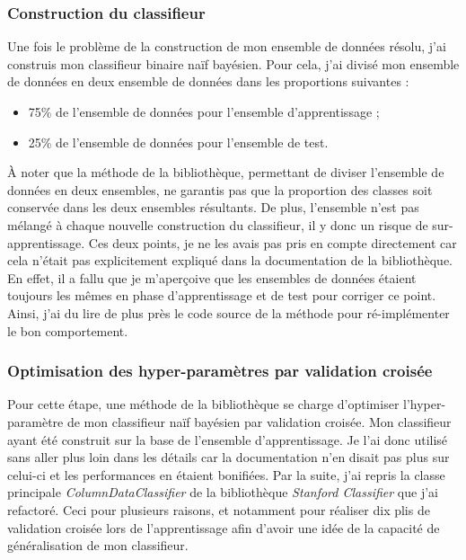             \subsubsection{Construction du classifieur}
                Une fois le problème de la construction de mon ensemble de données résolu, j'ai construis mon classifieur binaire naïf bayésien. Pour cela, j'ai divisé mon ensemble de données en deux ensemble de données dans les proportions suivantes :
                \begin{itemize}
                    \item 75\% de l'ensemble de données pour l'ensemble d'apprentissage ;
                    \item 25\% de l'ensemble de données pour l'ensemble de test.\\
                \end{itemize}
                À noter que la méthode de la bibliothèque, permettant de diviser l'ensemble de données en deux ensembles, ne garantis pas que la proportion des classes soit conservée dans les deux ensembles résultants. De plus, l'ensemble n'est pas mélangé à chaque nouvelle construction du classifieur, il y donc un risque de sur-apprentissage. Ces deux points, je ne les avais pas pris en compte directement car cela n'était pas explicitement expliqué dans la documentation de la bibliothèque. En effet, il a fallu que je m'aperçoive que les ensembles de données étaient toujours les mêmes en phase d'apprentissage et de test pour corriger ce point. Ainsi, j'ai du lire de plus près le code source de la méthode pour ré-implémenter le bon comportement.

            \subsubsection{Optimisation des hyper-paramètres par validation croisée}
                Pour cette étape, une méthode de la bibliothèque se charge d'optimiser l'hyper-paramètre de mon classifieur naïf bayésien par validation croisée. Mon classifieur ayant été construit sur la base de l'ensemble d'apprentissage. Je l'ai donc utilisé sans aller plus loin dans les détails car la documentation n'en disait pas plus sur celui-ci et les performances en étaient bonifiées. Par la suite, j'ai repris la classe principale \textit{ColumnDataClassifier} de la bibliothèque \textit{Stanford Classifier} que j'ai refactoré. Ceci pour plusieurs raisons, et notamment pour réaliser dix plis de validation croisée lors de l'apprentissage afin d'avoir une idée de la capacité de généralisation de mon classifieur.

